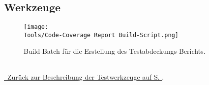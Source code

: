 %



\newpage





\subsection*{Werkzeuge}



\begin{figure}[ht]

	\centering
	\label{Abb:Werkzeuge:Coverage_Build_Batch}
	
	\texttt{[image: \\Tools/Code-Coverage Report Build-Script.png]}
	
	\caption{Build-Batch für die Erstellung des Testabdeckungs-Berichts.}

\end{figure}

~\\
{\hyperref[Abschnitt:Tests:Werkzeuge]{\mousecursor~Zurück zur Beschreibung der Testwerkzeuge auf S. \pageref{Abschnitt:Tests:Werkzeuge}}.}






